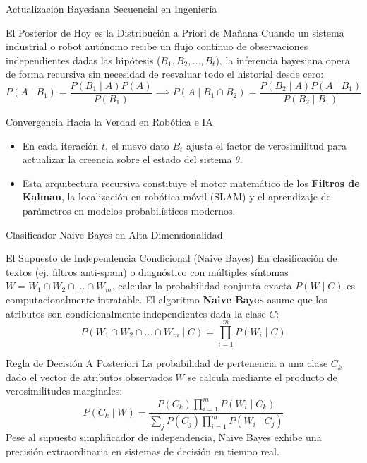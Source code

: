\documentclass[10pt, aspectratio=169]{beamer}
\begin{document}
\begin{frame}{Actualización Bayesiana Secuencial en Ingeniería}
  \fontsize{7.5pt}{9pt}\selectfont
  \begin{block}{El Posterior de Hoy es la Distribución a Priori de Mañana}
    \fontsize{7.5pt}{9pt}\selectfont
    Cuando un sistema industrial o robot autónomo recibe un flujo continuo de observaciones independientes dadas las hipótesis ($B_1, B_2, \ldots, B_t$), la inferencia bayesiana opera de forma recursiva sin necesidad de reevaluar todo el historial desde cero:
    $$P(A \mid B_1) = \frac{P(B_1 \mid A)P(A)}{P(B_1)} \implies P(A \mid B_1 \cap B_2) = \frac{P(B_2 \mid A)P(A \mid B_1)}{P(B_2 \mid B_1)}$$
  \end{block}
  \vspace{-0.15cm}
  \pause
  \begin{alertblock}{Convergencia Hacia la Verdad en Robótica e IA}
    \fontsize{7.5pt}{9pt}\selectfont
    \begin{itemize}\itemsep=0.08cm
      \item En cada iteración $t$, el nuevo dato $B_t$ ajusta el factor de verosimilitud para actualizar la creencia sobre el estado del sistema $\theta$.
      \item Esta arquitectura recursiva constituye el motor matemático de los \textbf{Filtros de Kalman}, la localización en robótica móvil (SLAM) y el aprendizaje de parámetros en modelos probabilísticos modernos.
    \end{itemize}
  \end{alertblock}
\end{frame}

\begin{frame}{Clasificador Naive Bayes en Alta Dimensionalidad}
  \fontsize{7.5pt}{9pt}\selectfont
  \begin{block}{El Supuesto de Independencia Condicional (Naive Bayes)}
    \fontsize{7.5pt}{9pt}\selectfont
    En clasificación de textos (ej. filtros anti-spam) o diagnóstico con múltiples síntomas $W = W_1 \cap W_2 \cap \ldots \cap W_m$, calcular la probabilidad conjunta exacta $P(W \mid C)$ es computacionalmente intratable. El algoritmo \textbf{Naive Bayes} asume que los atributos son condicionalmente independientes dada la clase $C$:
    $$P(W_1 \cap W_2 \cap \ldots \cap W_m \mid C) = \prod_{i=1}^m P(W_i \mid C)$$
  \end{block}
  \vspace{-0.15cm}
  \pause
  \begin{alertblock}{Regla de Decisión A Posteriori}
    \fontsize{7.5pt}{9pt}\selectfont
    La probabilidad de pertenencia a una clase $C_k$ dado el vector de atributos observados $W$ se calcula mediante el producto de verosimilitudes marginales:
    $$P(C_k \mid W) = \frac{P(C_k) \prod_{i=1}^m P(W_i \mid C_k)}{\sum_{j} P(C_j) \prod_{i=1}^m P(W_i \mid C_j)}$$
    Pese al supuesto simplificador de independencia, Naive Bayes exhibe una precisión extraordinaria en sistemas de decisión en tiempo real.
  \end{alertblock}
\end{frame}
\end{document}
